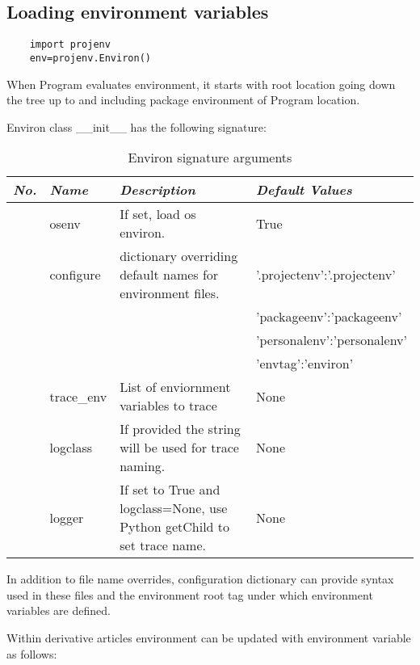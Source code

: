 \documentclass[design.tex]{subfiles}
\begin{document}
\subsection{Loading environment variables}

	\begin{lstlisting}
	import projenv 
	env=projenv.Environ()
	\end{lstlisting}

When Program evaluates environment, it starts with root location going down the tree up to and including package environment of Program location. 

Environ class \_\_init\_\_ has the following signature:

\begin{table}[!htb]
\setcounter{tablerownumbers}{0}
\begin{tabularx}{\linewidth}{|r|X|X|l|}
	\hline
	\emph{No.} & \emph{Name} & \emph{Description} & \emph{Default Values} \\ \hline
	\rownumber & osenv & If set, load os environ. & True \\ \hline
	\rownumber & configure\index{environ!configure} & dictionary overriding default names for environment files. & '.projectenv':'.projectenv' \\ \cline{4-4} 
	& & & 'packageenv':'packageenv' \\ \cline{4-4} 
	& & & 'personalenv':'personalenv' \\ \cline{4-4}
	& & & 'envtag':'environ' \\ \hline
	\rownumber & trace\_env & List of enviornment variables to trace & None \\ \hline
	\rownumber & logclass & If provided the string will be used for trace naming. & None \\ \hline
	\rownumber & logger & If set to True and logclass=None, use Python getChild to set trace name. & None \\ \hline
	
\end{tabularx}
\caption{Environ signature arguments}
\label{table:environ-args}
\end{table}

In addition to file name overrides, configuration dictionary can provide syntax used in these files and the environment root tag under which environment variables are defined. 

Within derivative articles environment can be updated with environment variable as follows:
\end{document}
